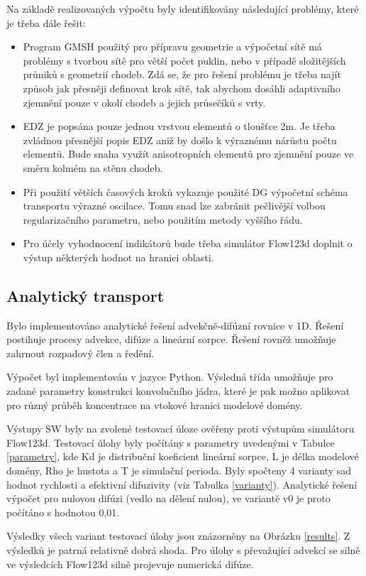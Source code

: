 \documentclass[11pt,a4paper]{article}
\begin{document}
\begin{onehalfspacing}
Na základě realizovaných výpočtu byly identifikovány následující problémy, které je třeba dále řešit:
\begin{itemize}
    \item Program GMSH použitý pro přípravu geometrie a výpočetní sítě má problémy s tvorbou sítě pro větší počet puklin, nebo v případě složitějších průniků s geometrií chodeb. Zdá se, že pro řešení problému je třeba najít způsob jak přesněji definovat 
    krok sítě, tak abychom dosáhli adaptivního zjemnění pouze v okolí chodeb a jejich průsečíků s vrty.
    \item EDZ je popsána pouze jednou vrstvou elementů o tloušťce 2m. Je třeba zvládnou přesnější popis EDZ aniž by došlo k výraznému nárůstu počtu elementů. Bude snaha využít anisotropních elementů pro zjemnění pouze ve směru kolmém na stěnu chodeb.
    \item Při použití větších časových kroků vykazuje použité DG výpočetní schéma transportu výrazné oscilace. Tomu snad lze zabránit
    pečlivější volbou regularizačního parametru, nebo použitím metody vyššího řádu.
    \item Pro účely vyhodnocení indikátorů bude třeba simulátor Flow123d doplnit o výstup některých hodnot na hranici oblasti.
\end{itemize}

\subsection{Analytický transport}
Bylo implementováno analytické řešení advekčně-difúzní rovnice v 1D.  
Řešení postihuje procesy advekce, difúze a lineární sorpce. Řešení rovněž umožňuje zahrnout rozpadový člen a ředění.

Výpočet byl implementován v jazyce Python. Výsledná třída umožňuje pro zadané parametry konstrukci konvolučního jádra, 
které je pak možno aplikovat pro různý průběh koncentrace na vtokové hranici modelové domény. 

Výstupy SW byly na zvolené testovací úloze ověřeny proti výstupům simulátoru Flow123d. 
Testovací úlohy byly počítány s parametry uvedenými v Tabulce \ref{parametry}, kde Kd je distribuční koeficient lineární sorpce, 
L je délka modelové domény, Rho je hustota a T je simulační perioda. Byly spočteny 4 varianty sad hodnot rychlosti a efektivní difuzivity (viz Tabulka \ref{varianty}). Analytické řešení výpočet pro nulovou difúzi (vedlo na dělení nulou), ve variantě v0 je proto počítáno s hodnotou 0,01.

Výsledky všech variant testovací úlohy jsou znázorněny na Obrázku \ref{results}. 
Z výsledků je patrná relativně dobrá shoda. Pro úlohy s převažující advekcí se silně ve výsledcích Flow123d silně projevuje 
numerická difúze.


\end{onehalfspacing}
\end{document}
